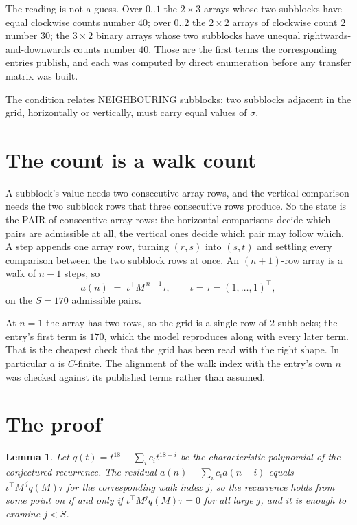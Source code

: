 \documentclass[11pt,a4paper]{article}
\theoremstyle{plain}
\newtheorem{lemma}[theorem]{Lemma}
\theoremstyle{definition}
\begin{document}
The reading is not a guess. Over $0..1$ the $2\times3$ arrays whose two subblocks have equal
clockwise counts number $40$; over $0..2$ the $2\times2$ arrays of clockwise count $2$ number
$30$; the $3\times2$ binary arrays whose two subblocks have unequal rightwards-and-downwards
counts number $40$. Those are the first terms the corresponding entries publish, and each was
computed by direct enumeration before any transfer matrix was built.

The condition relates NEIGHBOURING subblocks: two subblocks adjacent in the grid, horizontally
or vertically, must carry equal values of $\sigma$.

\section{The count is a walk count}

A subblock's value needs two consecutive array rows, and the vertical
comparison needs the two subblock rows that three consecutive rows produce. So the state is the
PAIR of consecutive array rows: the horizontal comparisons decide which pairs are admissible at
all, the vertical ones decide which pair may follow which. A step appends one array row,
turning $(r,s)$ into $(s,t)$ and settling every comparison between the two subblock rows at
once. An $(n+1)$-row array is a walk of $n-1$ steps, so
\[
a(n)\;=\;\iota^{\!\top}M^{\,n-1}\tau,\qquad\iota=\tau=(1,\dots,1)^{\!\top},
\]
on the $S=170$ admissible pairs.

At $n=1$ the array has two rows, so the grid is a single row of $2$
subblocks; the entry's first term is $170$, which the model
reproduces along with every later term. That is the cheapest check that the grid has been read
with the right shape.
In particular $a$ is $C$-finite. The alignment of the walk index with the entry's own $n$ was
checked against its published terms rather than assumed.

\section{The proof}

\begin{lemma}\label{lem:crit}
Let $q(t)=t^{18}-\sum_i c_it^{18-i}$ be the characteristic polynomial of the
conjectured recurrence. The residual $a(n)-\sum_ic_ia(n-i)$ equals
$\iota^{\!\top}M^{\,j}q(M)\tau$ for the corresponding walk index $j$, so the recurrence
holds from some point on if and only if $\iota^{\!\top}M^{j}q(M)\tau=0$ for all large $j$,
and it is enough to examine $j<S$.
\end{lemma}
\end{document}
